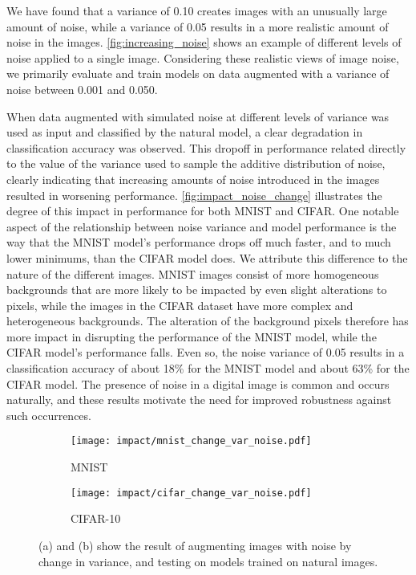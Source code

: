 \documentclass[conference]{IEEEtran}
\begin{document}
We have found that a variance of 0.10 creates images with an unusually large amount of noise, while a variance of 0.05 results in a more realistic amount of noise in the images. \autoref{fig:increasing_noise} shows an example of different levels of noise applied to a single image. Considering these realistic views of image noise, we primarily evaluate and train models on data augmented with a variance of noise between 0.001 and 0.050.

When data augmented with simulated noise at different levels of variance was used as input and classified by the natural model, a clear degradation in classification accuracy was observed. This dropoff in performance related directly to the value of the variance used to sample the additive distribution of noise, clearly indicating that increasing amounts of noise introduced in the images resulted in worsening performance. \autoref{fig:impact_noise_change} illustrates the degree of this impact in performance for both MNIST and CIFAR. One notable aspect of the relationship between noise variance and model performance is the way that the MNIST model’s performance drops off much faster, and to much lower minimums, than the CIFAR model does. We attribute this difference to the nature of the different images. MNIST images consist of more homogeneous backgrounds that are more likely to be impacted by even slight alterations to pixels, while the images in the CIFAR dataset have more complex and heterogeneous backgrounds. The alteration of the background pixels therefore has more impact in disrupting the performance of the MNIST model, while the CIFAR model’s performance falls. Even so, the noise variance of 0.05 results in a classification accuracy of about 18\% for the MNIST model and about 63\% for the CIFAR model. The presence of noise in a digital image is common and occurs naturally, and these results motivate the need for improved robustness against such occurrences.

\begin{figure}[H]
    \centering
    \begin{subfigure}{0.45\columnwidth}
        \centering
        \texttt{[image: impact/mnist\_change\_var\_noise.pdf]}
        \caption{MNIST}
    \end{subfigure}
    \begin{subfigure}{0.45\columnwidth}
        \centering
        \texttt{[image: impact/cifar\_change\_var\_noise.pdf]}
        \caption{CIFAR-10}
    \end{subfigure}
    \captionsetup{width=0.90\columnwidth}
    \caption{(a) and (b) show the result of augmenting images with noise by change in variance, and testing on models trained on natural images.}
    \label{fig:impact_noise_change}
\end{figure}
\end{document}
